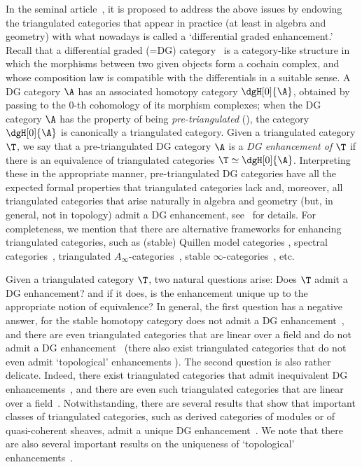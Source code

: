 \documentclass[a4paper]{amsart}
\begin{document}
In the seminal article~\cite{BK90}, it is proposed to address the above
issues by endowing the triangulated categories that appear in practice (at
least in algebra and geometry) with what nowadays is called a `differential
graded enhancement.' Recall that a differential graded (=DG)
category~\cite{Kel65} is a category-like structure in which the morphisms
between two given objects form a cochain complex, and whose composition law is
compatible with the differentials in a suitable sense. A DG category $\A$ has an
associated homotopy category $\dgH[0]{\A}$, obtained by passing to the $0$-th
cohomology of its morphism complexes; when the DG category $\A$ has the property
of being \emph{pre-triangulated} (), the category
$\dgH[0]{\A}$ is canonically a triangulated category. Given a triangulated
category $\T$, we say that a pre-triangulated DG category $\A$ is a \emph{DG
  enhancement of $\T$} if there is an equivalence of triangulated categories
$\T\simeq\dgH[0]{\A}$. Interpreting these in the appropriate manner,
pre-triangulated DG categories have all the expected formal properties that
triangulated categories lack and, moreover, all triangulated categories that
arise naturally in algebra and geometry (but, in general, not in topology) admit
a DG enhancement, see~\cite{Kel06} for details. For completeness, we mention
that there are alternative frameworks for enhancing triangulated categories,
such as (stable) Quillen model categories \cite{HPS97,Hov99}, spectral
categories~\cite{SS03}, triangulated $A_\infty$-categories~\cite{Lef03,BLM08},
stable $\infty$-categories~\cite{Lur17}, etc.

Given a triangulated category $\T$, two natural questions arise: Does $\T$ admit
a DG enhancement? and if it does, is the enhancement unique up to the
appropriate notion of equivalence? In general, the first question has a negative
answer, for the stable homotopy category does not admit a DG
enhancement~\cite{Sch10a}, and there are even triangulated categories that are
linear over a field and do not admit a DG enhancement~\cite{RVdB20} (there also exist
triangulated categories that do not even admit `topological' enhancements
\cite{MSS07}). The second question is also rather delicate. Indeed, there exist
triangulated categories that admit inequivalent DG
enhancements~\cite{DS07,Sch02}, and there are even such triangulated categories
that are linear over a field~\cite{Kaj13,RVdB19}. Notwithstanding, there are
several results that show that important classes of triangulated categories,
such as derived categories of modules or of quasi-coherent sheaves, admit a
unique DG enhancement~\cite{LO10,CS18,CNS22}. We note that there are also
several important results on the uniqueness of `topological'
enhancements~\cite{Ant18,Sch01,Sch07,SS02}.
\end{document}
